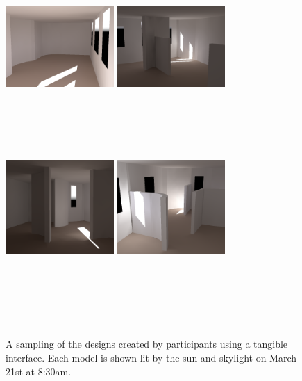 \documentclass{article}
\begin{document}
\begin{figure}[t]
\includegraphics[width=1.62in]{images/creativity/C_A6_2026obj_march_CROPPED.png}
\includegraphics[width=1.62in]{images/creativity/C_A2_FIXED_2020obj_march_CROPPED.png}\vspace{-0.2in}\\
\begin{minipage}{1.62in}~{\color{white}{\bf A6}}\end{minipage} 
\begin{minipage}{1.62in}~{\color{white}{\bf A2}}\end{minipage}\vspace{0.05in}\\
\includegraphics[width=1.62in]{images/creativity/C_N2_1994obj_march_CROPPED.png}
\includegraphics[width=1.62in]{images/creativity/C_N4_FIXED_2090obj_march_CROPPED.png}\vspace{-0.2in}\\
\begin{minipage}{1.62in}~{\color{white}{\bf N2}}\end{minipage} 
\begin{minipage}{1.62in}~{\color{white}{\bf N4}}\end{minipage}\vspace{-0.15in}\\
\caption{A sampling of the designs created by participants using a
  tangible interface.  Each model is shown lit by the sun and skylight on
  March 21st at 8:30am.
%
}
\label{figure:creativity_rendering}
\vspace{-0.1in}
\end{figure}
\end{document}
